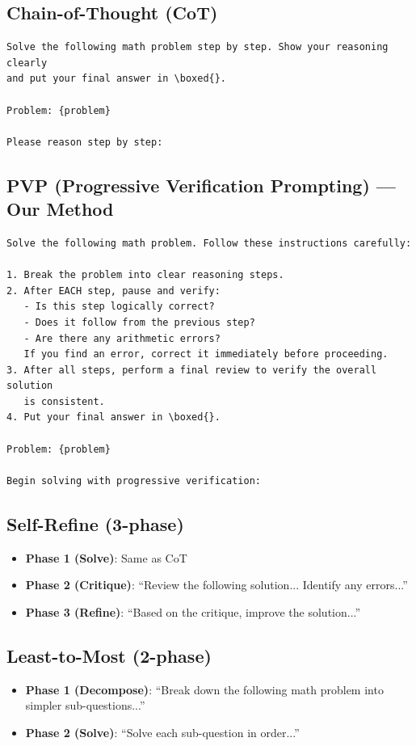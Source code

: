 \documentclass[conference]{IEEEtran}
\begin{document}
\subsection{Chain-of-Thought (CoT)}

\begin{lstlisting}
Solve the following math problem step by step. Show your reasoning clearly
and put your final answer in \boxed{}.

Problem: {problem}

Please reason step by step:
\end{lstlisting}

\subsection{PVP (Progressive Verification Prompting) --- Our Method}

\begin{lstlisting}
Solve the following math problem. Follow these instructions carefully:

1. Break the problem into clear reasoning steps.
2. After EACH step, pause and verify:
   - Is this step logically correct?
   - Does it follow from the previous step?
   - Are there any arithmetic errors?
   If you find an error, correct it immediately before proceeding.
3. After all steps, perform a final review to verify the overall solution
   is consistent.
4. Put your final answer in \boxed{}.

Problem: {problem}

Begin solving with progressive verification:
\end{lstlisting}

\subsection{Self-Refine (3-phase)}
\begin{itemize}
    \item \textbf{Phase 1 (Solve)}: Same as CoT
    \item \textbf{Phase 2 (Critique)}: ``Review the following solution... Identify any errors...''
    \item \textbf{Phase 3 (Refine)}: ``Based on the critique, improve the solution...''
\end{itemize}

\subsection{Least-to-Most (2-phase)}
\begin{itemize}
    \item \textbf{Phase 1 (Decompose)}: ``Break down the following math problem into simpler sub-questions...''
    \item \textbf{Phase 2 (Solve)}: ``Solve each sub-question in order...''
\end{itemize}
\end{document}
